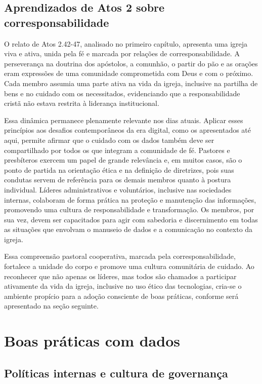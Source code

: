 \subsection{Aprendizados de Atos 2 sobre corresponsabilidade}

O relato de Atos 2.42-47, analisado no primeiro capítulo, apresenta uma igreja viva e ativa, unida pela fé e marcada por relações de corresponsabilidade. A perseverança na doutrina dos apóstolos, a comunhão, o partir do pão e as orações eram expressões de uma comunidade comprometida com Deus e com o próximo. Cada membro assumia uma parte ativa na vida da igreja, inclusive na partilha de bens e no cuidado com os necessitados, evidenciando que a responsabilidade cristã não estava restrita à liderança institucional.

Essa dinâmica permanece plenamente relevante nos dias atuais. Aplicar esses princípios aos desafios contemporâneos da era digital, como os apresentados até aqui, permite afirmar que o cuidado com os dados também deve ser compartilhado por todos os que integram a comunidade de fé. Pastores e presbíteros exercem um papel de grande relevância e, em muitos casos, são o ponto de partida na orientação ética e na definição de diretrizes, pois suas condutas servem de referência para os demais membros quanto à postura individual. Líderes administrativos e voluntários, inclusive nas sociedades internas, colaboram de forma prática na proteção e manutenção das informações, promovendo uma cultura de responsabilidade e transformação. Os membros, por sua vez, devem ser capacitados para agir com sabedoria e discernimento em todas as situações que envolvam o manuseio de dados e a comunicação no contexto da igreja.

Essa compreensão pastoral cooperativa, marcada pela corresponsabilidade, fortalece a unidade do corpo e promove uma cultura comunitária de cuidado. Ao reconhecer que não apenas os líderes, mas todos são chamados a participar ativamente da vida da igreja, inclusive no uso ético das tecnologias, cria-se o ambiente propício para a adoção consciente de boas práticas, conforme será apresentado na seção seguinte.

\section{Boas práticas com dados} \label{boas_praticas_com_dados}

\subsection{Políticas internas e cultura de governança}

